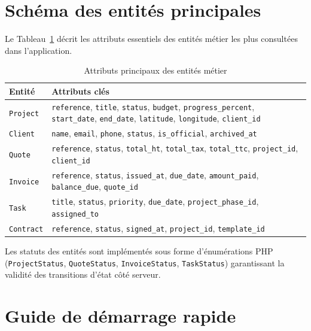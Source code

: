 \section{Schéma des entités principales}

Le Tableau~\ref{tab:entity_schema} décrit les attributs essentiels des entités
métier les plus consultées dans l'application.

\begin{table}[H]
\caption{Attributs principaux des entités métier}
\label{tab:entity_schema}
\centering
\small
\begin{tabular}{|l|p{10.5cm}|}
\hline
\textbf{Entité} & \textbf{Attributs clés} \\
\hline
\texttt{Project} & \texttt{reference}, \texttt{title}, \texttt{status}, \texttt{budget},
\texttt{progress\_percent}, \texttt{start\_date}, \texttt{end\_date},
\texttt{latitude}, \texttt{longitude}, \texttt{client\_id} \\
\hline
\texttt{Client} & \texttt{name}, \texttt{email}, \texttt{phone}, \texttt{status},
\texttt{is\_official}, \texttt{archived\_at} \\
\hline
\texttt{Quote} & \texttt{reference}, \texttt{status}, \texttt{total\_ht},
\texttt{total\_tax}, \texttt{total\_ttc}, \texttt{project\_id}, \texttt{client\_id} \\
\hline
\texttt{Invoice} & \texttt{reference}, \texttt{status}, \texttt{issued\_at},
\texttt{due\_date}, \texttt{amount\_paid}, \texttt{balance\_due}, \texttt{quote\_id} \\
\hline
\texttt{Task} & \texttt{title}, \texttt{status}, \texttt{priority},
\texttt{due\_date}, \texttt{project\_phase\_id}, \texttt{assigned\_to} \\
\hline
\texttt{Contract} & \texttt{reference}, \texttt{status}, \texttt{signed\_at},
\texttt{project\_id}, \texttt{template\_id} \\
\hline
\end{tabular}
\end{table}

\medskip

Les statuts des entités sont implémentés sous forme d'énumérations PHP
(\texttt{ProjectStatus}, \texttt{QuoteStatus}, \texttt{InvoiceStatus},
\texttt{TaskStatus}) garantissant la validité des transitions d'état côté
serveur.

\section{Guide de démarrage rapide}

